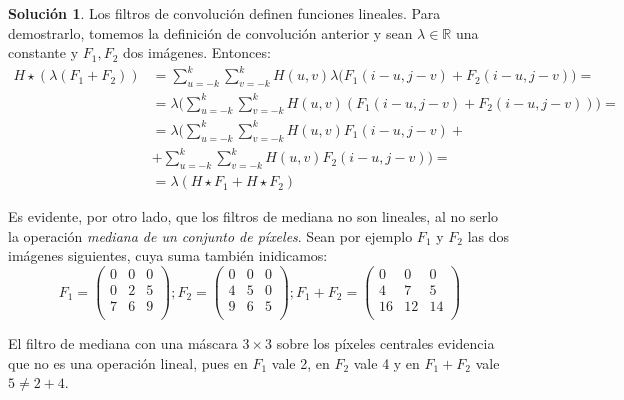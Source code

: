 \documentclass[a4paper, 11pt]{article}
\theoremstyle{definition}
\newtheorem*{solucion}{Solución}
\theoremstyle{theorem}
\begin{document}
  \begin{solucion}
      Los filtros de convolución definen funciones lineales. Para demostrarlo, tomemos la definición de convolución anterior y sean $\lambda\in\mathbb{R}$ una constante y $F_1,F_2$ dos imágenes. Entonces:
      \begin{align*}
          H\star(\lambda(F_1+F_2)) &= \sum_{u=-k}^k\sum_{v=-k}^k H(u,v)\lambda\biggl(F_1(i-u,j-v)+F_2(i-u,j-v)\biggr) = \\
          &= \lambda\biggl(\sum_{u=-k}^k\sum_{v=-k}^k H(u,v)(F_1(i-u,j-v)+F_2(i-u,j-v))\biggr) = \\
          &= \lambda\biggl(\sum_{u=-k}^k\sum_{v=-k}^k H(u,v)F_1(i-u,j-v) + \\
          &+ \sum_{u=-k}^k\sum_{v=-k}^k H(u,v)F_2(i-u,j-v)\biggr) = \\
          &= \lambda(H\star F_1 + H\star F_2)
      \end{align*}

      Es evidente, por otro lado, que los filtros de mediana no son lineales, al no serlo la operación \emph{mediana de un conjunto de píxeles}. Sean por ejemplo $F_1$ y $F_2$ las dos imágenes siguientes, cuya suma también inidicamos:
      \[
      F_1 = \left(
      \begin{array}{ccc}
          0 & 0 & 0 \\
          0 & 2 & 5 \\
          7 & 6 & 9 \\
      \end{array}
      \right);
      F_2 = \left(
      \begin{array}{ccc}
          0 & 0 & 0 \\
          4 & 5 & 0 \\
          9 & 6 & 5 \\
      \end{array}
      \right);
      F_1+F_2 = \left(
      \begin{array}{ccc}
          0 & 0 & 0 \\
          4 & 7 & 5 \\
          16 & 12 & 14 \\
      \end{array}
      \right)
      \]

      El filtro de mediana con una máscara $3\times3$ sobre los píxeles centrales evidencia que no es una operación lineal, pues en $F_1$ vale 2, en $F_2$ vale 4 y en $F_1+F_2$ vale $5\neq2+4$.
  \end{solucion}
\end{document}
